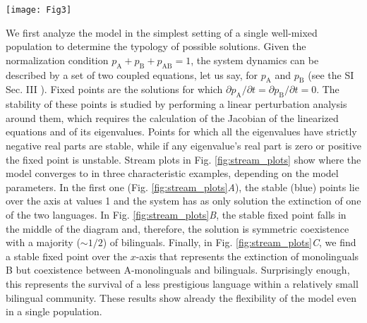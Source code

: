 \documentclass[../thesis.tex]{subfiles}
\begin{document}
\begin{figure*}
    \centering
    \texttt{[image: Fig3]}
    \caption{Flow diagrams for the dynamics of two languages according to our model
    described in equation \eqref{eq:bipref_model} set in a well-mixed population.
    $p_{\text{A}}$ and $p_{\text{B}}$ denote the proportions of monolinguals in A and B,
    respectively, and the proportion of bilinguals $p_{\text{AB}}$ is such that
    $p_{\text{A}} + p_{\text{B}} + p_{\text{AB}} = 1$. The mortality rate is fixed at
    $\mu = 0.02$. (\textit{A}) For $s = q = 1/2$ and $c=0.02$, the stable outcome is
    extinction of one of the two languages. (\textit{B}) For $s = q = 1/2$ and $c =
    0.05$, the higher learning rate leads to a solution featuring stable coexistence.
    (\textit{C}) For $s = 0.57$, $q = 0.45$ and $c = 0.05$, despite the lower prestige,
    B survives in a small community of bilinguals as it is the preferred language among
    them.}
    \label{fig:stream_plots}
\end{figure*}

We first analyze the model in the simplest setting of a single well-mixed population to
determine the typology of possible solutions. Given the normalization condition
$p_\text{A}+p_\text{B}+p_\text{AB} = 1$, the system dynamics can be described by a set
of two coupled equations, let us say, for $p_\text{A}$ and $p_\text{B}$ (see the SI Sec.
III \cite{supp}). Fixed points are the solutions for which $\partial p_\text{A}/\partial
t = \partial p_\text{B}/\partial t = 0$. The stability of these points is studied by
performing a linear perturbation analysis around them, which requires the calculation of
the Jacobian of the linearized equations and of its eigenvalues. Points for which all
the eigenvalues have strictly negative real parts are stable, while if any eigenvalue's
real part is zero or positive the fixed point is unstable. Stream plots in Fig.
\ref{fig:stream_plots} show where the model converges to in three characteristic
examples, depending on the model parameters. In the first one (Fig.
\ref{fig:stream_plots}\textit{A}), the stable (blue) points lie over the axis at values
1 and the system has as only solution the extinction of one of the two languages. In
Fig. \ref{fig:stream_plots}\textit{B}, the stable fixed point falls in the middle of the
diagram and, therefore, the solution is symmetric coexistence with a majority ($\sim
1/2$) of bilinguals. Finally, in Fig. \ref{fig:stream_plots}\textit{C}, we find a stable
fixed point over the $x$-axis that represents the extinction of monolinguals B but
coexistence between A-monolinguals and bilinguals. Surprisingly enough, this represents
the survival of a less prestigious language within a relatively small bilingual
community. These results show already the flexibility of the model even in a single
population.
\end{document}
